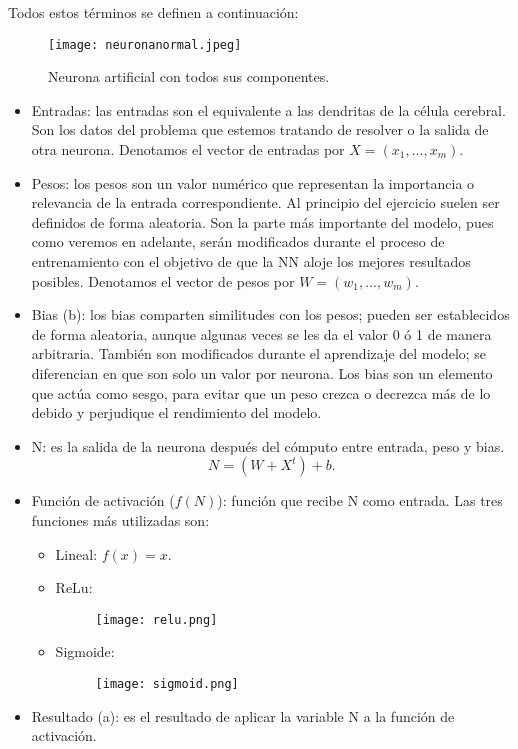 \documentclass[a4paper,11pt]{article}
\begin{document}
\noindent
Todos estos términos se definen a continuación:
\begin{figure}[H]
\centering
\texttt{[image: neuronanormal.jpeg]}
\caption{Neurona artificial con todos sus componentes.}
\end{figure}

\begin{itemize}
    \item Entradas: las entradas son el equivalente a las dendritas de la célula cerebral. Son los datos del problema que estemos tratando de resolver o la salida de otra neurona. Denotamos el vector de entradas por $X=(x_1,...,x_m)$.
    \item Pesos: los pesos son un valor numérico que representan la importancia o relevancia de la entrada correspondiente. Al principio del ejercicio suelen ser definidos de forma aleatoria. Son la parte más importante del modelo, pues como veremos en adelante, serán modificados durante el proceso de entrenamiento con el objetivo de que la NN aloje los mejores resultados posibles. Denotamos el vector de pesos por $W=(w_1,...,w_m)$.
    \item Bias (b): los bias comparten similitudes con los pesos; pueden ser establecidos de forma aleatoria, aunque algunas veces se les da el valor 0 ó 1 de manera arbitraria. También son modificados durante el aprendizaje del modelo; se diferencian en que son solo un valor por neurona. Los bias son un elemento que actúa como sesgo, para evitar que un peso crezca o decrezca más de lo debido y perjudique el rendimiento del modelo.
    \item N: es la salida de la neurona después del cómputo entre entrada, peso y bias.\\                                           \begin{equation}N=(W+X^t)+b.\end{equation}
    \item Función de activación ($f(N)$): función que recibe N como entrada. Las tres funciones más utilizadas son:
    \begin{itemize}
    \item Lineal: $f(x)=x.$ 
    \item ReLu: 		\begin{figure}[H]
				\centering
				\texttt{[image: relu.png]}
				\end{figure}
    \item Sigmoide: 	\begin{figure}[H]
				\centering
				\texttt{[image: sigmoid.png]}
				\end{figure}
	
    \end{itemize}
    \item Resultado (a): es el resultado de aplicar la variable N a la función de activación.
        
\end{itemize}
\end{document}
